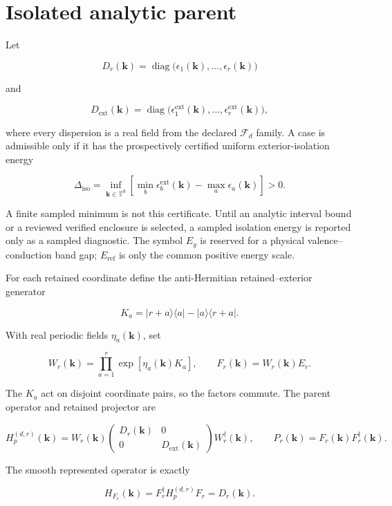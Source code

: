 \documentclass[11pt]{article}
\begin{document}
\section{Isolated analytic parent}

Let

\[
D_r(\mathbf k)=\operatorname{diag}
\bigl(\epsilon_1(\mathbf k),\ldots,\epsilon_r(\mathbf k)\bigr)
\]

and

\[
D_{\mathrm{ext}}(\mathbf k)=\operatorname{diag}
\bigl(\epsilon^{\mathrm{ext}}_1(\mathbf k),\ldots,
\epsilon^{\mathrm{ext}}_r(\mathbf k)\bigr),
\]

where every dispersion is a real field from the declared $\mathcal F_d$ family. A case
is admissible only if it has the prospectively certified uniform exterior-isolation
energy

\[
\Delta_{\mathrm{iso}}=\inf_{\mathbf k\in\mathbb T^d}
\left[
\min_b\epsilon_b^{\mathrm{ext}}(\mathbf k)
-\max_a\epsilon_a(\mathbf k)
\right]>0.
\]

A finite sampled minimum is not this certificate. Until an analytic interval bound or a
reviewed verified enclosure is selected, a sampled isolation energy is reported only as
a sampled diagnostic. The symbol $E_g$ is reserved for a physical valence--conduction
band gap; $E_{\mathrm{ref}}$ is only the common positive energy scale.

For each retained coordinate define the anti-Hermitian retained--exterior generator

\[
K_a=|r+a\rangle\langle a|-|a\rangle\langle r+a|.
\]

With real periodic fields $\eta_a(\mathbf k)$, set

\[
W_r(\mathbf k)=\prod_{a=1}^{r}
\exp\!\left[\eta_a(\mathbf k)K_a\right],
\qquad
F_r(\mathbf k)=W_r(\mathbf k)E_r.
\]

The $K_a$ act on disjoint coordinate pairs, so the factors commute. The parent operator
and retained projector are

\[
H_p^{(d,r)}(\mathbf k)=W_r(\mathbf k)
\begin{pmatrix}
D_r(\mathbf k)&0\\
0&D_{\mathrm{ext}}(\mathbf k)
\end{pmatrix}
W_r^\dagger(\mathbf k),
\qquad
P_r(\mathbf k)=F_r(\mathbf k)F_r^\dagger(\mathbf k).
\]

The smooth represented operator is exactly

\[
H_{F_r}(\mathbf k)=F_r^\dagger H_p^{(d,r)}F_r=D_r(\mathbf k).
\]
\end{document}
